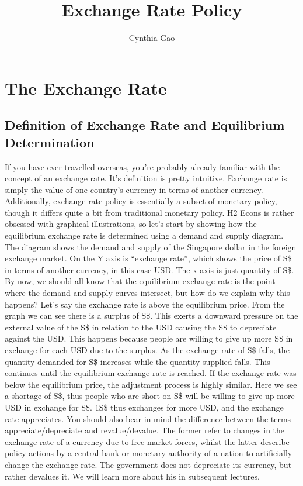\documentclass[DIV=classic,11pt,numbers=noenddot,listof=totoc,bibliography=totoc,parskip]{scrartcl}
\title{Exchange Rate Policy}
\author{Cynthia Gao}
\date{}
\begin{document}
\maketitle
\tableofcontents
\newpage
\section{The Exchange Rate}
\subsection{Definition of Exchange Rate and Equilibrium Determination}
If you have ever travelled overseas, you’re probably already familiar with the concept of an exchange rate. It’s definition is pretty intuitive. Exchange rate is simply the value of one country’s currency in terms of another currency. Additionally, exchange rate policy is essentially a subset of monetary policy, though it differs quite a bit from traditional monetary policy. H2 Econs is rather obsessed with graphical illustrations, so let’s start by showing how the equilibrium exchange rate is determined using a demand and supply diagram. The diagram shows the demand and supply of the Singapore dollar in the foreign exchange market. On the Y axis is “exchange rate”, which shows the price of S\$ in terms of another currency, in this case USD. The x axis is just quantity of S\$. By now, we should all know that the equilibrium exchange rate is the point where the demand and supply curves intersect, but how do we explain why this happens? Let’s say the exchange rate is above the equilibrium price. From the graph we can see there is a surplus of S\$. This exerts a downward pressure on the external value of the S\$ in relation to the USD causing the S\$ to depreciate against the USD. This happens because people are willing to give up more S\$ in exchange for each USD due to the surplus. As the exchange rate of S\$ falls, the quantity demanded for S\$ increases while the quantity supplied falls. This continues until the equilibrium exchange rate is reached. If the exchange rate was below the equilibrium price, the adjustment process is highly similar. Here we see a shortage of S\$, thus people who are short on S\$ will be willing to give up more USD in exchange for S\$. 1S\$ thus exchanges for more USD, and the exchange rate appreciates. You should also bear in mind the difference between the terms appreciate/depreciate and revalue/devalue. The former refer to changes in the exchange rate of a currency due to free market forces, whilst the latter describe policy actions by a central bank or monetary authority of a nation to artificially change the exchange rate. The government does not depreciate its currency, but rather devalues it. We will learn more about his in subsequent lectures.
\end{document}
